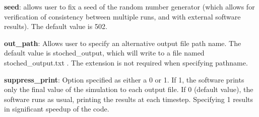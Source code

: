 {\bfseries seed}\+: allows user to fix a seed of the random number generator (which allows for verification of consistency between multiple runs, and with external software results). The default value is 502.

{\bfseries out\+\_\+path}\+: Allows user to specify an alternative output file path name. The default value is stoched\+\_\+output, which will write to a file named stoched\+\_\+output.\+txt . The extension is not required when specifying pathname.

{\bfseries suppress\+\_\+print}\+: Option specified as either a 0 or 1. If 1, the software prints only the final value of the simulation to each output file. If 0 (default value), the software runs as usual, printing the results at each timestep. Specifying 1 results in significant speedup of the code. 